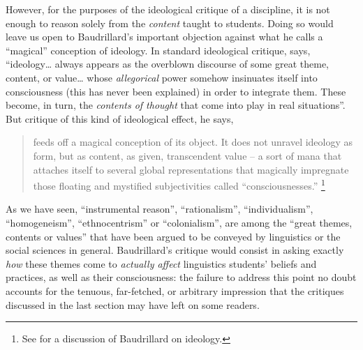 \documentclass[output=paper]{langscibook}
\begin{document}
However, for the purposes of the ideological critique of a discipline, it is not enough to reason solely from the \emph{content} taught to students. Doing so would leave us open to Baudrillard's important objection against what he calls a ``magical'' conception of ideology. In standard ideological critique, \citet[76]{Baudrillard19881972} says, ``ideology… always appears as the overblown discourse of some great theme, content, or value… whose \emph{allegorical} power somehow insinuates itself into consciousness (this has never been explained) in order to integrate them. These become, in turn, the \emph{contents of thought} that come into play in real situations''. But critique of this kind of ideological effect, he says,

\begin{quotation}
feeds off a magical conception of its object. It does not unravel ideology as form, but as content, as given, transcendent value – a sort of mana that attaches itself to several global representations that magically impregnate those floating and mystified subjectivities called ``consciousnesses.'' \citep[77]{Baudrillard19881972}\footnote{See \citet{Larrain1994} for a discussion of Baudrillard on ideology.} 
\end{quotation}

As we have seen, ``instrumental reason'', ``rationalism'', ``individualism'', ``homogeneism'', ``ethnocentrism'' or ``colonialism'', are among the ``great themes, contents or values'' that have been argued to be conveyed by linguistics or the social sciences in general. Baudrillard's critique would consist in asking exactly \emph{how} these themes come to \emph{actually affect} linguistics students' beliefs and practices, as well as their consciousness: the failure to address this point no doubt accounts for the tenuous, far-fetched, or arbitrary impression that the critiques discussed in the last section may have left on some readers. 
\end{document}
